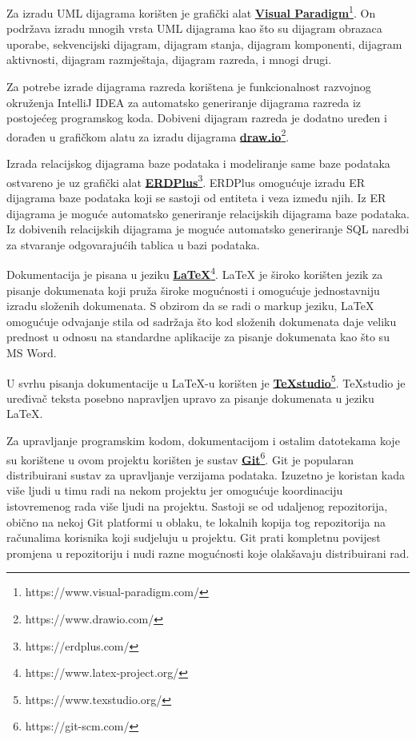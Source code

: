 			Za izradu UML dijagrama korišten je grafički alat \href{https://www.visual-paradigm.com/}{\textbf{Visual Paradigm}}\footnote{https://www.visual-paradigm.com/}. On podržava izradu mnogih vrsta UML dijagrama kao što su dijagram obrazaca uporabe, sekvencijski dijagram, dijagram stanja, dijagram komponenti, dijagram aktivnosti, dijagram razmještaja, dijagram razreda, i mnogi drugi.
			
			Za potrebe izrade dijagrama razreda korištena je funkcionalnost razvojnog okruženja IntelliJ IDEA za automatsko generiranje dijagrama razreda iz postojećeg programskog koda. Dobiveni dijagram razreda je dodatno uređen i dorađen u grafičkom alatu za izradu dijagrama  \href{https://www.drawio.com/}{\textbf{draw.io}}\footnote{https://www.drawio.com/}.
			
			Izrada relacijskog dijagrama baze podataka i modeliranje same baze podataka ostvareno je uz grafički alat \href{https://erdplus.com/}{\textbf{ERDPlus}}\footnote{https://erdplus.com/}. ERDPlus omogućuje izradu ER dijagrama baze podataka koji se sastoji od entiteta i veza između njih. Iz ER dijagrama je moguće automatsko generiranje relacijskih dijagrama baze podataka. Iz dobivenih relacijskih dijagrama je moguće automatsko generiranje SQL naredbi za stvaranje odgovarajućih tablica u bazi podataka.
			
			Dokumentacija je pisana u jeziku \href{https://www.latex-project.org/}{\textbf{LaTeX}}\footnote{https://www.latex-project.org/}. LaTeX je široko korišten jezik za pisanje dokumenata koji pruža široke mogućnosti i omogućuje jednostavniju izradu složenih dokumenata. S obzirom da se radi o markup jeziku, LaTeX omogućuje odvajanje stila od sadržaja što kod složenih dokumenata daje veliku prednost u odnosu na standardne aplikacije za pisanje dokumenata kao što su MS Word.
			
			U svrhu pisanja dokumentacije u LaTeX-u korišten je \href{https://www.texstudio.org/}{\textbf{TeXstudio}}\footnote{https://www.texstudio.org/}. TeXstudio je uređivač teksta posebno napravljen upravo za pisanje dokumenata u jeziku LaTeX.
			
			Za upravljanje programskim kodom, dokumentacijom i ostalim datotekama koje su korištene u ovom projektu korišten je sustav \href{https://git-scm.com/}{\textbf{Git}}\footnote{https://git-scm.com/}. Git je popularan distribuirani sustav za upravljanje verzijama podataka. Izuzetno je koristan kada više ljudi u timu radi na nekom projektu jer omogućuje koordinaciju istovremenog rada više ljudi na projektu. Sastoji se od udaljenog repozitorija, obično na nekoj Git platformi u oblaku, te lokalnih kopija tog repozitorija na računalima korisnika koji sudjeluju u projektu. Git prati kompletnu povijest promjena u repozitoriju i nudi razne mogućnosti koje olakšavaju distribuirani rad.
			
